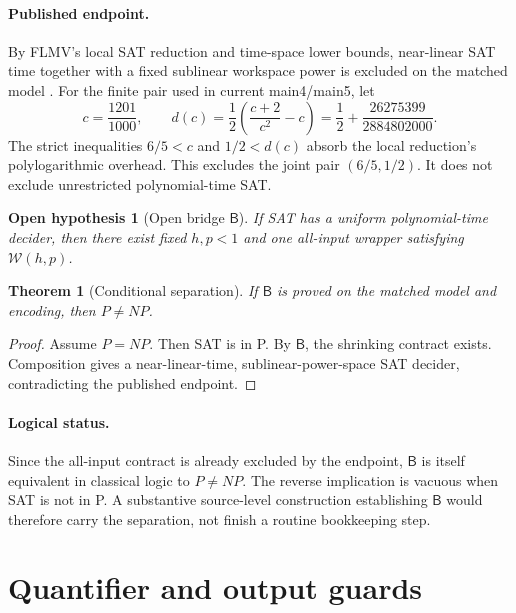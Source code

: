 \documentclass[11pt]{article}
\newtheorem{theorem}{Theorem}
\newtheorem{hypothesis}{Open hypothesis}
\begin{document}
\paragraph{Published endpoint.}
By FLMV's local SAT reduction and time-space lower bounds,
near-linear SAT time together with a fixed sublinear workspace power
is excluded on the matched model \cite{flmv}.
For the finite pair used in current main4/main5, let
\[
c=\frac{1201}{1000},\qquad
d(c)=\frac12\left(\frac{c+2}{c^2}-c\right)
=\frac12+\frac{26275399}{2884802000}.
\]
The strict inequalities $6/5<c$ and $1/2<d(c)$ absorb the local reduction's
polylogarithmic overhead. This excludes the joint pair $(6/5,1/2)$.
It does not exclude unrestricted polynomial-time SAT.

\begin{hypothesis}[Open bridge $\mathsf B$]
If SAT has a uniform polynomial-time decider, then there exist fixed
$h,p<1$ and one all-input wrapper satisfying $\mathcal W(h,p)$.
\end{hypothesis}

\begin{theorem}[Conditional separation]
If $\mathsf B$ is proved on the matched model and encoding, then $P\ne NP$.
\end{theorem}

\begin{proof}
Assume $P=NP$. Then SAT is in P. By $\mathsf B$, the shrinking contract
exists. Composition gives a near-linear-time, sublinear-power-space SAT
decider, contradicting the published endpoint.
\end{proof}

\paragraph{Logical status.}
Since the all-input contract is already excluded by the endpoint,
$\mathsf B$ is itself equivalent in classical logic to $P\ne NP$.
The reverse implication is vacuous when SAT is not in P.
A substantive source-level construction establishing $\mathsf B$ would
therefore carry the separation, not finish a routine bookkeeping step.

\section{Quantifier and output guards}
\end{document}
